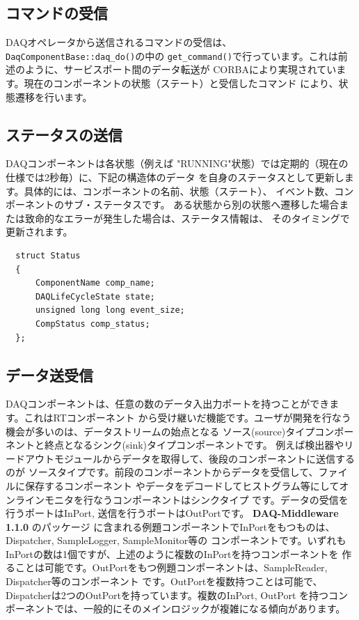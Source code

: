 \documentclass[a4j,10pt,dvips,onecolumn,oneside,final]{jarticle}%
\newcommand {\daqmwcurrent} {
	{\bf DAQ-Middleware 1.1.0}
}
\begin{document}
\subsection{コマンドの受信}
DAQオペレータから送信されるコマンドの受信は、\verb|DaqComponentBase::daq_do()|の中の 
\verb|get_command()|で行っています。これは前述のように、サービスポート間のデータ転送が
CORBAにより実現されています。現在のコンポーネントの状態（ステート）と受信したコマンド
により、状態遷移を行います。

\subsection{ステータスの送信}
DAQコンポーネントは各状態（例えば "RUNNING"状態）では定期的（現在の仕様では2秒毎）に、下記の構造体のデータ
を自身のステータスとして更新します。具体的には、コンポーネントの名前、状態（ステート）、
イベント数、コンポーネントのサブ・ステータスです。
ある状態から別の状態へ遷移した場合または致命的なエラーが発生した場合は、ステータス情報は、
そのタイミングで更新されます。

\begin{Verbatim}
  struct Status
  {
      ComponentName comp_name;
      DAQLifeCycleState state;
      unsigned long long event_size;
      CompStatus comp_status;
  };
\end{Verbatim}

\subsection{データ送受信}
DAQコンポーネントは、任意の数のデータ入出力ポートを持つことができます。これはRTコンポーネント
から受け継いだ機能です。ユーザが開発を行なう機会が多いのは、データストリームの始点となる
ソース(source)タイプコンポーネントと終点となるシンク(sink)タイプコンポーネントです。
例えば検出器やリードアウトモジュールからデータを取得して、後段のコンポーネントに送信するのが
ソースタイプです。前段のコンポーネントからデータを受信して、ファイルに保存するコンポーネント
やデータをデコードしてヒストグラム等にしてオンラインモニタを行なうコンポーネントはシンクタイプ
です。データの受信を行うポートはInPort, 送信を行うポートはOutPortです。\daqmwcurrent のパッケージ
に含まれる例題コンポーネントでInPortをもつものは、Dispatcher, SampleLogger, SampleMonitor等の
コンポーネントです。いずれもInPortの数は1個ですが、上述のように複数のInPortを持つコンポーネントを
作ることは可能です。OutPortをもつ例題コンポーネントは、SampleReader, Dispatcher等のコンポーネント
です。OutPortを複数持つことは可能で、Dispatcherは2つのOutPortを持っています。複数のInPort, OutPort
を持つコンポーネントでは、一般的にそのメインロジックが複雑になる傾向があります。
\end{document}
